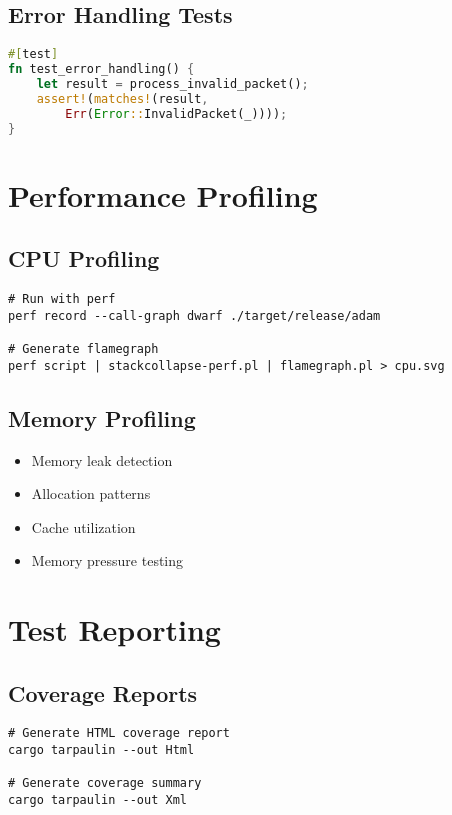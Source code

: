 \documentclass{article}
\begin{document}
\subsection{Error Handling Tests}
\begin{lstlisting}[language=rust]
#[test]
fn test_error_handling() {
    let result = process_invalid_packet();
    assert!(matches!(result, 
        Err(Error::InvalidPacket(_))));
}
\end{lstlisting}

\section{Performance Profiling}

\subsection{CPU Profiling}
\begin{verbatim}
# Run with perf
perf record --call-graph dwarf ./target/release/adam

# Generate flamegraph
perf script | stackcollapse-perf.pl | flamegraph.pl > cpu.svg
\end{verbatim}

\subsection{Memory Profiling}
\begin{itemize}
    \item Memory leak detection
    \item Allocation patterns
    \item Cache utilization
    \item Memory pressure testing
\end{itemize}

\section{Test Reporting}

\subsection{Coverage Reports}
\begin{verbatim}
# Generate HTML coverage report
cargo tarpaulin --out Html

# Generate coverage summary
cargo tarpaulin --out Xml
\end{verbatim}
\end{document}
